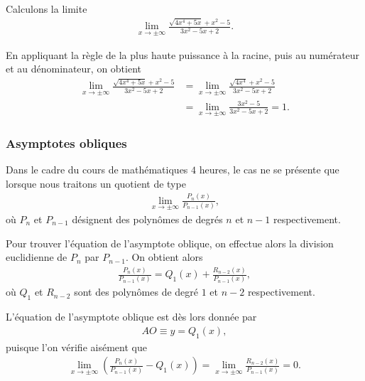 \documentclass[main.tex]{subfiles}
\begin{document}
\begin{example}

    Calculons la limite
    \begin{align}
        \lim_{x \to \pm \infty} \frac {\sqrt{4x^4 + 5x} + x^2 - 5} {3 x^2 - 5x + 2}.
    \end{align}

    En appliquant la règle de la plus haute puissance à la racine,
    puis au numérateur et au dénominateur,
    on obtient
    \begin{align}
        \lim_{x \to \pm \infty} \frac {\sqrt{4x^4 + 5x} + x^2 - 5} {3 x^2 - 5x + 2}
        &= \lim_{x \to \pm \infty} \frac {\sqrt{4x^4} + x^2 - 5} {3 x^2 - 5x + 2}\\
        &= \lim_{x \to \pm \infty} \frac {3 x^2 - 5} {3 x^2 - 5x + 2} = 1.
    \end{align}
\end{example}

\subsubsection{Asymptotes obliques}

Dans le cadre du cours de mathématiques $4$ heures,
le cas ne se présente que lorsque nous traitons un quotient de type
\begin{align}
    \lim_{x \to \pm \infty} \frac {P_n(x)} {P_{n - 1}(x)},
\end{align}
où $P_n$ et $P_{n - 1}$ désignent des polynômes de degrés $n$ et $n - 1$ respectivement.

Pour trouver l'équation de l'asymptote oblique,
on effectue alors la division euclidienne de $P_n$ par $P_{n - 1}$.
On obtient alors
\begin{align}
    \frac {P_n(x)} {P_{n - 1}(x)} = Q_1(x) + \frac {R_{n - 2}(x)} {P_{n - 1}(x)},
\end{align}
où $Q_1$ et $R_{n - 2}$ sont des polynômes de degré $1$ et $n - 2$ respectivement.

L'équation de l'asymptote oblique est dès lors donnée par
\begin{align}
    AO \equiv y = Q_1(x),
\end{align}
puisque l'on vérifie aisément que
\begin{align}
    \lim_{x \to \pm \infty} \left(\frac {P_n(x)} {P_{n - 1}(x)} - Q_1(x)\right)
    = \lim_{x \to \pm \infty} \frac {R_{n - 2}(x)} {P_{n - 1}(x)} = 0.
\end{align}
\end{document}
